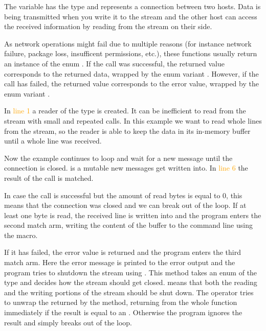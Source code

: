 The variable  has the type  and represents a connection between two hosts. Data is being
transmitted when you write it to the stream and the other host can access the received information by reading from the
stream on their side.

As network operations might fail due to multiple reasons (for instance network failure, package loss, insufficent
permissions, etc.), these functions usually return an instance of the enum . If the call was
successful, the returned value corresponds to the returned data, wrapped by the enum variant . However, if
the call has failed, the returned value corresponds to the error value, wrapped by the enum variant .

In \textcolor{orange}{line 1} a reader of the type  is created. It can be inefficient to read
from the stream with small and repeated calls. In this example we want to read whole lines from the stream, so the
reader is able to keep the data in its in-memory buffer until a whole line was received.

Now the example continues to loop and wait for a new message until the connection is closed.  is a mutable
 new messages get written into. In \textcolor{orange}{line 6} the result of the call
 is matched.

In case the call is successful but the amount of read bytes is equal to 0, this means that the connection was closed
and we can break out of the loop. If at least one byte is read, the received line is written into  and the
program enters the second match arm, writing the content of the buffer to the command line using the
 macro.

If it has failed, the error value is returned and the program enters the third match arm. Here the error message is
printed to the error output and the program tries to shutdown the stream using . This
method takes an enum of the type  and decides how the stream should get closed. 
means that both the reading and the writing portions of the stream should be shut down. The  operator tries to
unwrap the  returned by the method, returning from the whole function immediately if the result is equal
to an . Otherwise the program ignores the result and simply breaks out of the loop.

